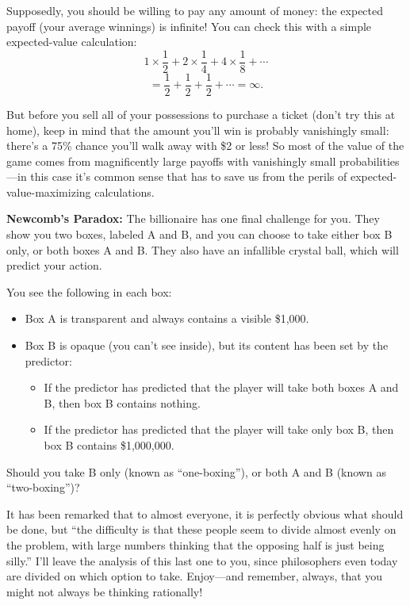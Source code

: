 \documentclass{article}
\begin{document}
Supposedly, you should be willing to pay any amount of money: the expected payoff (your average winnings) is infinite! You can check this with a simple expected-value calculation:
\[1\times\frac12 + 2\times\frac14 + 4\times\frac18 + \cdots \]
\[= \frac12 + \frac12 + \frac12 + \cdots = \infty.\]

But before you sell all of your possessions to purchase a ticket (don't try this at home), keep in mind that the amount you'll win is probably vanishingly small: there's a 75\% chance you'll walk away with \$2 or less! So most of the value of the game comes from magnificently large payoffs with vanishingly small probabilities---in this case it's common sense that has to save us from the perils of expected-value-maximizing calculations.

\textbf{Newcomb’s Paradox:} The billionaire has one final challenge for you. They show you two boxes, labeled A and B, and you can choose to take either box B only, or both boxes A and B.
They also have an infallible crystal ball, which will predict your action.

You see the following in each box:
\begin{itemize}
    \item Box A is transparent and always contains a visible \$1,000.
    \item Box B is opaque (you can't see inside), but its content has been set by the predictor:
    \begin{itemize}
    \item If the predictor has predicted that the player will take both boxes A and B, then box B contains nothing.
    \item If the predictor has predicted that the player will take only box B, then box B contains \$1,000,000.
    \end{itemize}
\end{itemize}
Should you take B only (known as ``one-boxing''), or both A and B (known as ``two-boxing'')?

It has been remarked that to almost everyone, it is perfectly obvious what should be done, but ``the difficulty is that these people seem to divide almost evenly on the problem, with large numbers thinking that the opposing half is just being silly.''
I'll leave the analysis of this last one to you, since philosophers even today are divided on which option to take. Enjoy---and remember, always, that you might not always be thinking rationally!
\end{document}
